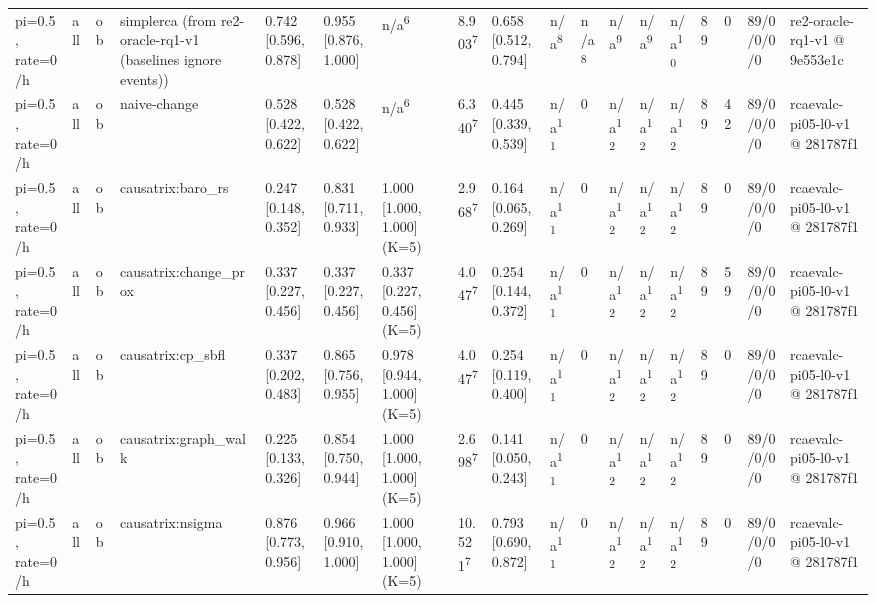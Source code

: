 \begin{table}[t]
\begin{tabular}{llllllllllllllllll}
pi=0.5, rate=0/h & all & ob & simplerca (from re2-oracle-rq1-v1 (baselines ignore events)) & 0.742 [0.596, 0.878] & 0.955 [0.876, 1.000] & n/a\textsuperscript{6} & 8.903\textsuperscript{7} & 0.658 [0.512, 0.794] & n/a\textsuperscript{8} & n/a\textsuperscript{8} & n/a\textsuperscript{9} & n/a\textsuperscript{9} & n/a\textsuperscript{10} & 89 & 0 & 89/0/0/0/0 & re2-oracle-rq1-v1 @ 9e553e1c \\
pi=0.5, rate=0/h & all & ob & naive-change & 0.528 [0.422, 0.622] & 0.528 [0.422, 0.622] & n/a\textsuperscript{6} & 6.340\textsuperscript{7} & 0.445 [0.339, 0.539] & n/a\textsuperscript{11} & 0 & n/a\textsuperscript{12} & n/a\textsuperscript{12} & n/a\textsuperscript{12} & 89 & 42 & 89/0/0/0/0 & rcaevalc-pi05-l0-v1 @ 281787f1 \\
pi=0.5, rate=0/h & all & ob & causatrix:baro\_rs & 0.247 [0.148, 0.352] & 0.831 [0.711, 0.933] & 1.000 [1.000, 1.000] (K=5) & 2.968\textsuperscript{7} & 0.164 [0.065, 0.269] & n/a\textsuperscript{11} & 0 & n/a\textsuperscript{12} & n/a\textsuperscript{12} & n/a\textsuperscript{12} & 89 & 0 & 89/0/0/0/0 & rcaevalc-pi05-l0-v1 @ 281787f1 \\
pi=0.5, rate=0/h & all & ob & causatrix:change\_prox & 0.337 [0.227, 0.456] & 0.337 [0.227, 0.456] & 0.337 [0.227, 0.456] (K=5) & 4.047\textsuperscript{7} & 0.254 [0.144, 0.372] & n/a\textsuperscript{11} & 0 & n/a\textsuperscript{12} & n/a\textsuperscript{12} & n/a\textsuperscript{12} & 89 & 59 & 89/0/0/0/0 & rcaevalc-pi05-l0-v1 @ 281787f1 \\
pi=0.5, rate=0/h & all & ob & causatrix:cp\_sbfl & 0.337 [0.202, 0.483] & 0.865 [0.756, 0.955] & 0.978 [0.944, 1.000] (K=5) & 4.047\textsuperscript{7} & 0.254 [0.119, 0.400] & n/a\textsuperscript{11} & 0 & n/a\textsuperscript{12} & n/a\textsuperscript{12} & n/a\textsuperscript{12} & 89 & 0 & 89/0/0/0/0 & rcaevalc-pi05-l0-v1 @ 281787f1 \\
pi=0.5, rate=0/h & all & ob & causatrix:graph\_walk & 0.225 [0.133, 0.326] & 0.854 [0.750, 0.944] & 1.000 [1.000, 1.000] (K=5) & 2.698\textsuperscript{7} & 0.141 [0.050, 0.243] & n/a\textsuperscript{11} & 0 & n/a\textsuperscript{12} & n/a\textsuperscript{12} & n/a\textsuperscript{12} & 89 & 0 & 89/0/0/0/0 & rcaevalc-pi05-l0-v1 @ 281787f1 \\
pi=0.5, rate=0/h & all & ob & causatrix:nsigma & 0.876 [0.773, 0.956] & 0.966 [0.910, 1.000] & 1.000 [1.000, 1.000] (K=5) & 10.521\textsuperscript{7} & 0.793 [0.690, 0.872] & n/a\textsuperscript{11} & 0 & n/a\textsuperscript{12} & n/a\textsuperscript{12} & n/a\textsuperscript{12} & 89 & 0 & 89/0/0/0/0 & rcaevalc-pi05-l0-v1 @ 281787f1 \\

\end{tabular}
\end{table}
